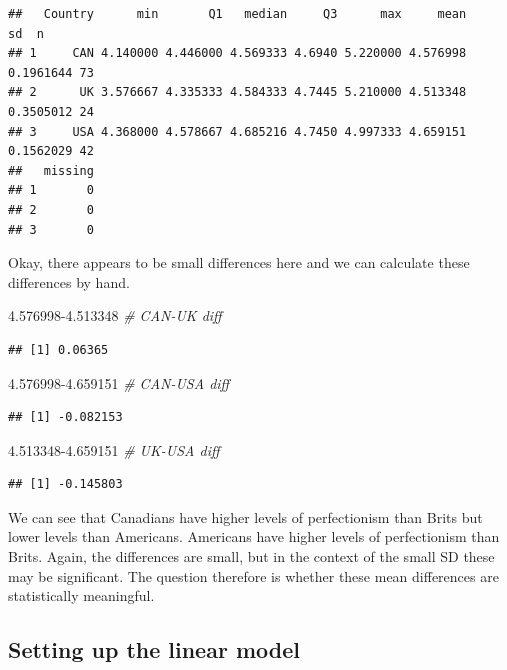 \documentclass[
]{article}
\newenvironment{Shaded}{\begin{snugshade}}{\end{snugshade}}
\newcommand{\CommentTok}[1]{\textcolor[rgb]{0.56,0.35,0.01}{\textit{#1}}}
\newcommand{\FloatTok}[1]{\textcolor[rgb]{0.00,0.00,0.81}{#1}}
\begin{document}
\begin{verbatim}
##   Country      min       Q1   median     Q3      max     mean        sd  n
## 1     CAN 4.140000 4.446000 4.569333 4.6940 5.220000 4.576998 0.1961644 73
## 2      UK 3.576667 4.335333 4.584333 4.7445 5.210000 4.513348 0.3505012 24
## 3     USA 4.368000 4.578667 4.685216 4.7450 4.997333 4.659151 0.1562029 42
##   missing
## 1       0
## 2       0
## 3       0
\end{verbatim}

Okay, there appears to be small differences here and we can calculate
these differences by hand.

\begin{Shaded}
\begin{Highlighting}[]
\FloatTok{4.576998{-}4.513348} \CommentTok{\# CAN{-}UK diff}
\end{Highlighting}
\end{Shaded}

\begin{verbatim}
## [1] 0.06365
\end{verbatim}

\begin{Shaded}
\begin{Highlighting}[]
\FloatTok{4.576998{-}4.659151} \CommentTok{\# CAN{-}USA diff}
\end{Highlighting}
\end{Shaded}

\begin{verbatim}
## [1] -0.082153
\end{verbatim}

\begin{Shaded}
\begin{Highlighting}[]
\FloatTok{4.513348{-}4.659151} \CommentTok{\# UK{-}USA diff}
\end{Highlighting}
\end{Shaded}

\begin{verbatim}
## [1] -0.145803
\end{verbatim}

We can see that Canadians have higher levels of perfectionism than Brits
but lower levels than Americans. Americans have higher levels of
perfectionism than Brits. Again, the differences are small, but in the
context of the small SD these may be significant. The question therefore
is whether these mean differences are statistically meaningful.

\subsection{Setting up the linear
model}\label{setting-up-the-linear-model-2}
\end{document}
